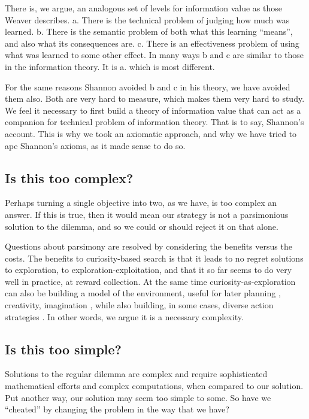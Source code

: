 There is, we argue, an analogous set of levels for information value as those Weaver describes. a. There is the technical problem of judging how much was learned. b. There is the semantic problem of both what this learning ``means'', and also what its consequences are. c. There is an effectiveness problem of using what was learned to some other effect. In many ways b and c are similar to those in the information theory. It is a. which is most different. 

For the same reasons Shannon avoided b and c in his theory, we have avoided them also. Both are very hard to measure, which makes them very hard to study. We feel it necessary to first build a theory of information value that can act as a companion for technical problem of information theory. That is to say, Shannon's account. This is why we took an axiomatic approach, and why we have tried to ape Shannon's axioms, as it made sense to do so.


\subsection*{Is this too complex?}
Perhaps turning a single objective into two, as we have, is too complex an answer. If this is true, then it would mean our strategy is not a parsimonious solution to the dilemma, and so we could or should reject it on that alone. 

Questions about parsimony are resolved by considering the benefits versus the costs. The benefits to curiosity-based search is that it leads to no regret solutions to exploration, to exploration-exploitation, and that it so far seems to do very well in practice, at reward collection. At the same time curiosity-as-exploration can also be building a model of the environment, useful for later planning \citep{Ahilan2019,Poucet1993}, creativity, imagination \citep{Schmidhuber2010}, while also building, in some cases, diverse action strategies \citep{Lehman2011a,Lehman2013,Mouret2015,Colas2020}. In other words, we argue it is a necessary complexity. 


\subsection*{Is this too simple?}
Solutions to the regular dilemma are complex and require sophisticated mathematical efforts and complex computations, when compared to our solution. Put another way, our solution may seem too simple to some. So have we ``cheated'' by changing the problem in the way that we have?

